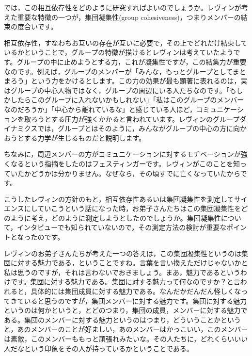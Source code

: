 \documentclass{ltjsbook}
\begin{document}
では，この相互依存性をどのように研究すればよいのでしょうか。レヴィンが考えた重要な特徴の一つが，集団凝集性(group cohesiveness)，つまりメンバーの結束の度合いです。

相互依存性，すなわちお互いの存在が互いに必要で，その上でどれだけ結束しているかということで，グループの特徴が描けるとレヴィンは考えていたようです。グループの中に止めようとする力，これが凝集性ですが，この結集力が重要なのです。例えば，グループのメンバーが「みんな，もっとグループとしてまとまろう」という力をかけるとします。この力の効果が最も顕著に表れるのは，実はグループの中心人物ではなく，グループの周辺にいる人たちなのです。「もしかしたらこのグループに入れないかもしれない」「私はこのグループのメンバーなのだろうか」「中心から離れているな」と感じている人ほど，コミュニケーションを取ろうとする圧力が強くかかると言われています。レヴィンのグループダイナミクスでは，グループとはそのように，みんながグループの中心の方に向かおうとする力学が生じるものだと説明します。

ちなみに，周辺メンバーの方がコミュニケーションに対するモチベーションが強くなるという指摘をしたのはフェスティンガーです。レヴィンがこのことを知っていたかどうかは分かりません。なぜなら，その頃すでに亡くなっていたからです。

こうしたレヴィンの方針のもと，相互依存性あるいは集団凝集性を測定してサイエンスにしていこうという話になった時，お弟子さんたちはこの集団凝集性をどのように考え，どのように測定しようとしたのでしょうか。集団凝集性について，インタビューでも知られていないので，その測定方法の検討が重要なポイントとなったのです。

レヴィンのお弟子さんたちが考えた一つの答えは，この集団凝集性というのは集団に対する魅力である，ということですね。言葉を言い換えただけじゃないかと私は思うのですが，それは言わないでおきましょう。まあ，魅力であるというわけです。集団に対する魅力である。集団に対する魅力って何なのですか？と言われると，具体的には集団成員に対する魅力である。なんだかだんだん怪しくなってきていると思うのですが，集団メンバーに対する魅力です。集団に対する魅力というのは何かというと，とどのつまり，集団の成員，メンバーに対する魅力である。集団のメンバーに対する魅力というのはつまり，どういうことかというと，あのメンバーのことが好ましい，あのメンバーはかっこいい，このメンバーは素敵，このメンバーももっと頑張れみたいな。その人たちに，どれくらいいい人だなという印象をその人が持っているかということである。
\end{document}
